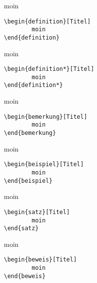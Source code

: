 {\begin{multicols}{2}
\begingroup\begin{definition}[Titel]
moin
\begin{lstlisting}[style=latex]
\begin{definition}[Titel]
        moin
\end{definition}\end{lstlisting}
\end{definition}\endgroup

\begingroup\begin{definition*}[Titel]
moin
\begin{lstlisting}[style=latex]
\begin{definition*}[Titel]
        moin
\end{definition*}\end{lstlisting}
\end{definition*}\endgroup

\begingroup\begin{bemerkung}[Titel]
moin
\begin{lstlisting}[style=latex]
\begin{bemerkung}[Titel]
        moin
\end{bemerkung}\end{lstlisting}
\end{bemerkung}\endgroup

\begingroup\begin{beispiel}[Titel]
moin
\begin{lstlisting}[style=latex]
\begin{beispiel}[Titel]
        moin
\end{beispiel}\end{lstlisting}
\end{beispiel}\endgroup

\begingroup\begin{satz}[Titel]
moin
\begin{lstlisting}[style=latex]
\begin{satz}[Titel]
        moin
\end{satz}\end{lstlisting}
\end{satz}\endgroup

\columnbreak

\begingroup\begin{beweis}[Titel]
moin
\begin{lstlisting}[style=latex]
\begin{beweis}[Titel]
        moin
\end{beweis}\end{lstlisting}
\end{beweis}\endgroup


\end{multicols}}
